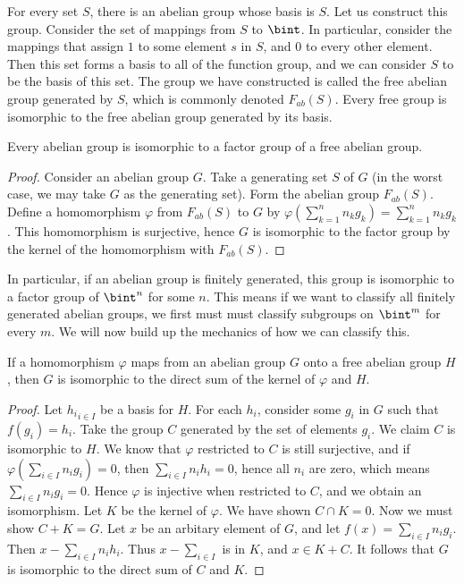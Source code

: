 For every set $S$, there is an abelian group whose basis is $S$. Let us construct this group. Consider the set of mappings from $S$ to $\bint$. In particular, consider the mappings that assign $1$ to some element $s$ in $S$, and $0$ to every other element. Then this set forms a basis to all of the function group, and we can consider $S$ to be the basis of this set. The group we have constructed is called the free abelian group generated by $S$, which is commonly denoted $F_{ab}(S)$. Every free group is isomorphic to the free abelian group generated by its basis.

\begin{theorem}
    Every abelian group is isomorphic to a factor group of a free abelian group.
\end{theorem}
\begin{proof}
    Consider an abelian group $G$. Take a generating set $S$ of $G$ (in the worst case, we may take $G$ as the generating set). Form the abelian group $F_{ab}(S)$. Define a homomorphism $\varphi$ from $F_{ab}(S)$ to $G$ by $\varphi(\sum_{k = 1}^n n_kg_k) = \sum_{k = 1}^n n_kg_k$. This homomorphism is surjective, hence $G$ is isomorphic to the factor group by the kernel of the homomorphism with $F_{ab}(S)$.
\end{proof}

In particular, if an abelian group is finitely generated, this group is isomorphic to a factor group of $\bint^n$ for some $n$. This means if we want to classify all finitely generated abelian groups, we first must must classify subgroups on $\bint^m$ for every $m$. We will now build up the mechanics of how we can classify this.

\begin{lemma}
    If a homomorphism $\varphi$ maps from an abelian group $G$ onto a free abelian group $H$, then $G$ is isomorphic to the direct sum of the kernel of $\varphi$ and $H$.
\end{lemma}
\begin{proof}
    Let ${h_i}_{i \in I}$ be a basis for $H$. For each $h_i$, consider some $g_i$ in $G$ such that $f(g_i) = h_i$. Take the group $C$ generated by the set of elements $g_i$. We claim $C$ is isomorphic to $H$. We know that $\varphi$ restricted to $C$ is still surjective, and if $\varphi(\sum_{i \in I} n_ig_i) = 0$, then $\sum_{i \in I} n_ih_i = 0$, hence all $n_i$ are zero, which means $\sum_{i \in I} n_ig_i = 0$. Hence $\varphi$ is injective when restricted to $C$, and we obtain an isomorphism. Let $K$ be the kernel of $\varphi$. We have shown $C \cap K = 0$. Now we must show $C + K = G$. Let $x$ be an arbitary element of $G$, and let $f(x) = \sum_{i \in I} n_ig_i$. Then $x - \sum_{i \in I} n_ih_i$. Thus $x - \sum_{i \in I}$ is in $K$, and $x \in K + C$. It follows that $G$ is isomorphic to the direct sum of $C$ and $K$.
\end{proof}


